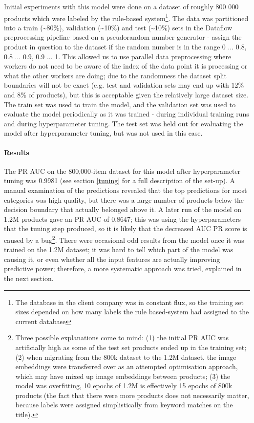 Initial experiments with this model were done on a dataset of roughly 800 000 products which were labeled by the rule-based system\footnote{The database in the client company was in constant flux, so the training set sizes depended on how many labels the rule based-system had assigned to the current database}.
The data was partitioned into a train (\textasciitilde80\%), validation (\textasciitilde10\%) and test (\textasciitilde10\%) sets in the Dataflow preprocessing pipeline based on a pseudorandom number generator - assign the product in question to the dataset if the random number is in the range 0 ... 0.8, 0.8 ... 0.9, 0.9 ... 1.
This allowed us to use parallel data preprocessing where workers do not need to be aware of the index of the data point it is processing or what the other workers are doing; due to the randomness the dataset split boundaries will not be exact (e.g. test and validation sets may end up with 12\% and 8\% of products), but this is acceptable given the relatively large dataset size.
The train set was used to train the model, and the validation set was used to evaluate the model periodically as it was trained - during individual training runs and during hyperparameter tuning.
The test set was held out for evaluating the model after hyperparameter tuning, but was not used in this case.

\paragraph{Results}
The PR AUC on the 800,000-item dataset for this model after hyperparameter tuning was 0.9981 (see section \ref{tuning} for a full description of the set-up).
A manual examination of the predictions revealed that the top predictions for most categories was high-quality, but there was a large number of products below the decision boundary that actually belonged above it.
A later run of the model on 1.2M products gave an PR AUC of 0.8647; this was using the hyperparameters that the tuning step produced, so it is likely that the decreased AUC PR score is caused by a bug\footnote{Three possible explanations come to mind: (1) the initial PR AUC was artificially high as some of the test set products ended up in the training set; (2) when migrating from the 800k dataset to the 1.2M dataset, the image embeddings were transferred over as an attempted optimisation approach, which may have mixed up image embeddings between products; (3) the model was overfitting, 10 epochs of 1.2M is effectively 15 epochs of 800k products (the fact that there were more products does not necessarily matter, because labels were assigned simplistically from keyword matches on the title).}.
There were occasional odd results from the model once it was trained on the 1.2M dataset; it was hard to tell which part of the model was causing it, or even whether all the input features are actually improving predictive power; therefore, a more systematic approach was tried, explained in the next section.

